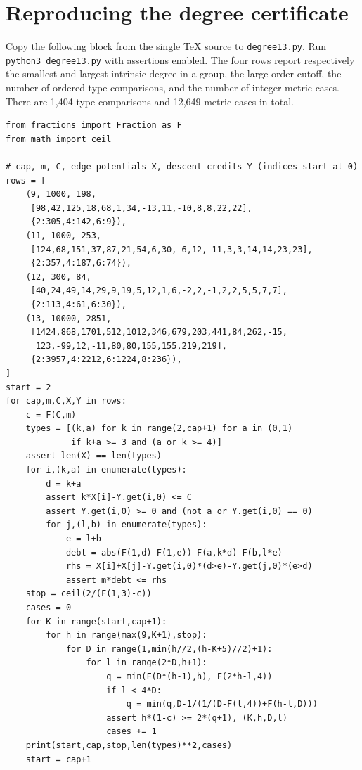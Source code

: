 \documentclass[11pt,a4paper]{article}
\begin{document}
\section{Reproducing the degree certificate}
Copy the following block from the single TeX source to \texttt{degree13.py}. Run \texttt{python3 degree13.py} with assertions enabled. The four rows report respectively the smallest and largest intrinsic degree in a group, the large-order cutoff, the number of ordered type comparisons, and the number of integer metric cases. There are 1,404 type comparisons and 12,649 metric cases in total.
\begin{Verbatim}[fontsize=\scriptsize]
from fractions import Fraction as F
from math import ceil

# cap, m, C, edge potentials X, descent credits Y (indices start at 0)
rows = [
    (9, 1000, 198,
     [98,42,125,18,68,1,34,-13,11,-10,8,8,22,22],
     {2:305,4:142,6:9}),
    (11, 1000, 253,
     [124,68,151,37,87,21,54,6,30,-6,12,-11,3,3,14,14,23,23],
     {2:357,4:187,6:74}),
    (12, 300, 84,
     [40,24,49,14,29,9,19,5,12,1,6,-2,2,-1,2,2,5,5,7,7],
     {2:113,4:61,6:30}),
    (13, 10000, 2851,
     [1424,868,1701,512,1012,346,679,203,441,84,262,-15,
      123,-99,12,-11,80,80,155,155,219,219],
     {2:3957,4:2212,6:1224,8:236}),
]
start = 2
for cap,m,C,X,Y in rows:
    c = F(C,m)
    types = [(k,a) for k in range(2,cap+1) for a in (0,1)
             if k+a >= 3 and (a or k >= 4)]
    assert len(X) == len(types)
    for i,(k,a) in enumerate(types):
        d = k+a
        assert k*X[i]-Y.get(i,0) <= C
        assert Y.get(i,0) >= 0 and (not a or Y.get(i,0) == 0)
        for j,(l,b) in enumerate(types):
            e = l+b
            debt = abs(F(1,d)-F(1,e))-F(a,k*d)-F(b,l*e)
            rhs = X[i]+X[j]-Y.get(i,0)*(d>e)-Y.get(j,0)*(e>d)
            assert m*debt <= rhs
    stop = ceil(2/(F(1,3)-c))
    cases = 0
    for K in range(start,cap+1):
        for h in range(max(9,K+1),stop):
            for D in range(1,min(h//2,(h-K+5)//2)+1):
                for l in range(2*D,h+1):
                    q = min(F(D*(h-1),h), F(2*h-l,4))
                    if l < 4*D:
                        q = min(q,D-1/(1/(D-F(l,4))+F(h-l,D)))
                    assert h*(1-c) >= 2*(q+1), (K,h,D,l)
                    cases += 1
    print(start,cap,stop,len(types)**2,cases)
    start = cap+1
\end{Verbatim}
\clearpage
\end{document}
